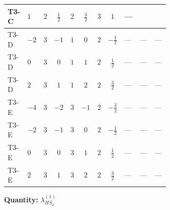 \documentclass[8pt]{article}
\begin{document}
\begin{landscape}
\begin{longtable}{@{}llcccccc >{\raggedright\arraybackslash}p{0.21\linewidth} >{\raggedright\arraybackslash}p{0.21\linewidth} >{\raggedright\arraybackslash}p{0.21\linewidth}@{}}
\midrule
T3-C & $1$ & $2$ & $\frac{1}{2}$ & $2$ & $\frac{3}{2}$ & $3$ & $1$ & --- & \scriptsize\adjustbox{max width=\linewidth}{$\begin{gathered} +\frac{9 {g_2}^4}{4}\end{gathered}$} & \scriptsize\adjustbox{max width=\linewidth}{$\begin{gathered} -9 {g_2}^2 {\lambda_{HS_2}^{(1)}}\end{gathered}$} \\
\midrule
T3-D & $-2$ & $3$ & $-1$ & $1$ & $0$ & $2$ & $-\frac{1}{2}$ & --- & --- & --- \\
\midrule
T3-D & $0$ & $3$ & $0$ & $1$ & $1$ & $2$ & $\frac{1}{2}$ & --- & --- & --- \\
\midrule
T3-D & $2$ & $3$ & $1$ & $1$ & $2$ & $2$ & $\frac{3}{2}$ & --- & --- & --- \\
\midrule
T3-E & $-4$ & $3$ & $-2$ & $3$ & $-1$ & $2$ & $-\frac{3}{2}$ & --- & --- & --- \\
\midrule
T3-E & $-2$ & $3$ & $-1$ & $3$ & $0$ & $2$ & $-\frac{1}{2}$ & --- & --- & --- \\
\midrule
T3-E & $0$ & $3$ & $0$ & $3$ & $1$ & $2$ & $\frac{1}{2}$ & --- & --- & --- \\
\midrule
T3-E & $2$ & $3$ & $1$ & $3$ & $2$ & $2$ & $\frac{3}{2}$ & --- & --- & --- \\
\midrule
\bottomrule
\end{longtable}
\clearpage
\noindent\textbf{Quantity: }$\lambda_{HS_2}^{(1)}$\par\smallskip

\end{landscape}
\end{document}

